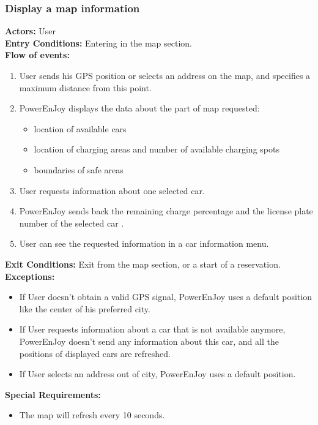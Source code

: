 \subsubsection{Display a map information}
%
\textbf{Actors:}
User\\
%
\textbf{Entry Conditions:}
Entering in the map section. \\
%
\textbf{Flow of events:}
\begin{enumerate}
\item User sends his GPS position or selects an address on the map, and specifies a maximum distance from this point.
\item PowerEnJoy displays the data about the part of map requested: 
\begin{itemize}
\item location of available cars
\item location of charging areas and number of available charging spots
\item boundaries of safe areas 
\end{itemize}
\item User requests information about one selected car.
\item PowerEnJoy sends back the remaining charge percentage and the license plate number of the selected car .
\item User can see the requested information in a car information menu.
\end{enumerate}
%
\textbf{Exit Conditions:}
Exit from the map section, or a start of a reservation. \\
%
\textbf{Exceptions:}
\begin{itemize}
\item If User doesn't obtain a valid GPS signal, PowerEnJoy uses a default position like the center of his preferred city.
\item If User requests information about a car that is not available anymore, PowerEnJoy doesn't send any information about this car, and all the positions of displayed cars are refreshed.
\item If User selects an address out of city, PowerEnJoy uses a default position.
\end{itemize}
%
\textbf{Special Requirements:}
\begin{itemize}
\item The map will refresh every 10 seconds.
\end{itemize}


